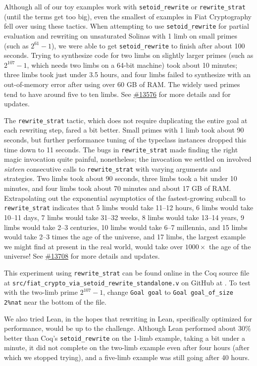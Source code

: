 \documentclass[a4paper,USenglish,cleveref,autoref,thm-restate]{lipics-v2021}
\newcommand{\coqbug}[1]{\href{https://github.com/coq/coq/issues/#1}{\##1}}
\begin{document}
Although all of our toy examples work with \texttt{setoid\_rewrite} or \texttt{rewrite\_strat} (until the terms get too big), even the smallest of examples in Fiat Cryptography fell over using these tactics.
When attempting to use \texttt{setoid\_rewrite} for partial evaluation and rewriting on unsaturated Solinas with 1 limb on small primes (such as $2^{61}-1$), we were able to get \texttt{setoid\_rewrite} to finish after about 100 seconds.
Trying to synthesize code for two limbs on slightly larger primes (such as $2^{107}-1$, which needs two limbs on a 64-bit machine) took about 10 minutes;
three limbs took just under 3.5 hours, and four limbs failed to synthesize with an out-of-memory error after using over 60 GB of RAM.
The widely used primes tend to have around five to ten limbs.
See \coqbug{13576} for more details and for updates.

The \texttt{rewrite\_strat} tactic, which does not require duplicating the entire goal at each rewriting step, fared a bit better.
Small primes with 1 limb took about 90 seconds, but further performance tuning of the typeclass instances dropped this time down to 11 seconds.
The bugs in \texttt{rewrite\_strat} made finding the right magic invocation quite painful, nonetheless; the invocation we settled on involved \emph{sixteen} consecutive calls to \texttt{rewrite\_strat} with varying arguments and strategies.
Two limbs took about 90 seconds, three limbs took a bit under 10 minutes, and four limbs took about 70 minutes and about 17 GB of RAM.
Extrapolating out the exponential asymptotics of the fastest-growing subcall to \texttt{rewrite\_strat} indicates that 5 limbs would take 11--12 hours, 6 limbs would take 10--11 days, 7 limbs would take 31--32 weeks, 8 limbs would take 13--14 years, 9 limbs would take 2--3 centuries, 10 limbs would take 6--7 millennia, and 15 limbs would take 2--3 times the age of the universe, and 17 limbs, the largest example we might find at present in the real world, would take over $1000\times$ the age of the universe!
See \coqbug{13708} for more details and updates.

This experiment using \verb|rewrite_strat| can be found online in the Coq source file at \texttt{src/fiat\_crypto\_via\_setoid\_rewrite\_standalone.v} on GitHub at .
To test with the two-limb prime $2^{107}-1$, change \verb|Goal goal| to \verb|Goal goal_of_size 2%nat| near the bottom of the file.

We also tried Lean, in the hopes that rewriting in Lean, specifically optimized for performance, would be up to the challenge.
Although Lean performed about 30\% better than Coq's \texttt{setoid\_rewrite} on the 1-limb example, taking a bit under a minute, it did not complete on the two-limb example even after four hours (after which we stopped trying), and a five-limb example was still going after 40 hours.
\end{document}
